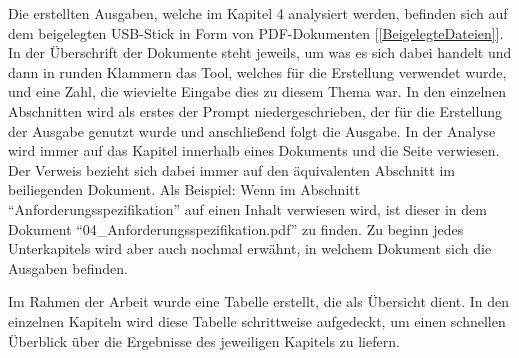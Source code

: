 Die erstellten Ausgaben, welche im Kapitel 4 analysiert werden, befinden sich auf dem beigelegten USB-Stick 
in Form von PDF-Dokumenten [\autoref{BeigelegteDateien}]. In der Überschrift der Dokumente steht jeweils, 
um was es sich dabei handelt und dann in runden Klammern das Tool, welches für die Erstellung verwendet 
wurde, und eine Zahl, die wievielte Eingabe dies zu diesem Thema war. In den einzelnen Abschnitten wird als erstes der 
Prompt niedergeschrieben, der für die Erstellung der Ausgabe genutzt wurde und anschließend folgt die Ausgabe. In der Analyse wird immer auf 
das Kapitel innerhalb eines Dokuments und die Seite verwiesen. Der Verweis bezieht sich dabei immer auf 
den äquivalenten Abschnitt im beiliegenden Dokument. Als Beispiel: Wenn im Abschnitt ``Anforderungsspezifikation'' auf einen Inhalt verwiesen wird, 
ist dieser in dem Dokument ``04\_Anforderungsspezifikation.pdf'' zu finden. Zu beginn jedes Unterkapitels wird aber auch nochmal 
erwähnt, in welchem Dokument sich die Ausgaben befinden.

Im Rahmen der Arbeit wurde eine Tabelle erstellt, die als Übersicht dient. In den einzelnen Kapiteln wird diese Tabelle 
schrittweise aufgedeckt, um einen schnellen Überblick über die Ergebnisse des jeweiligen Kapitels zu liefern.